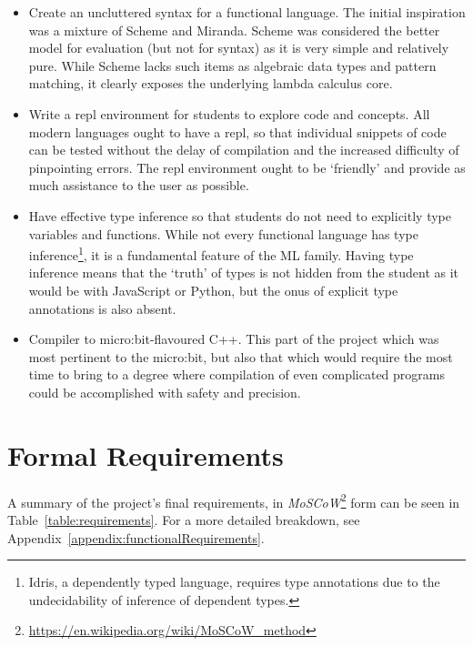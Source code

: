 \documentclass[12pt, a4paper]{report}
\begin{document}
\begin{itemize}
    \item Create an uncluttered syntax for a functional language. The initial inspiration was a
        mixture of Scheme and Miranda. Scheme was considered the better model for evaluation (but
        not for syntax) as it is very simple and relatively pure. While Scheme lacks such items as algebraic data types
        and pattern matching, it clearly exposes the underlying lambda calculus core.
    \item Write a repl environment for students to explore code and concepts. All modern languages
        ought to have a repl, so that individual snippets of code can be tested without the delay of
        compilation and the increased difficulty of pinpointing errors. The repl environment ought
        to be `friendly' and provide as much assistance to the user as possible. 
    \item Have effective type inference so that students do not need to explicitly type variables
        and functions. While not every functional language has type inference\footnote{Idris, a
        dependently typed language, requires type annotations due to the undecidability of inference of
        dependent types.}, it is a fundamental feature of the ML family. Having type inference means
        that the `truth' of types is not hidden from the student as it would be with JavaScript or
        Python, but the onus of explicit type annotations is also absent.
    \item Compiler to micro:bit-flavoured C++. This part of the project which was most
        pertinent to the micro:bit, but also that which would require the most time to bring to a
        degree where compilation of even complicated programs could be accomplished with safety and
        precision. 
\end{itemize}

\section{Formal Requirements}
\label{formalreq}
A summary of the project's final requirements, in
\textit{MoSCoW}\footnote{\url{https://en.wikipedia.org/wiki/MoSCoW_method}} form
can be seen in Table~\ref{table:requirements}. For a more detailed breakdown, see
Appendix~\ref{appendix:functionalRequirements}.
\end{document}
